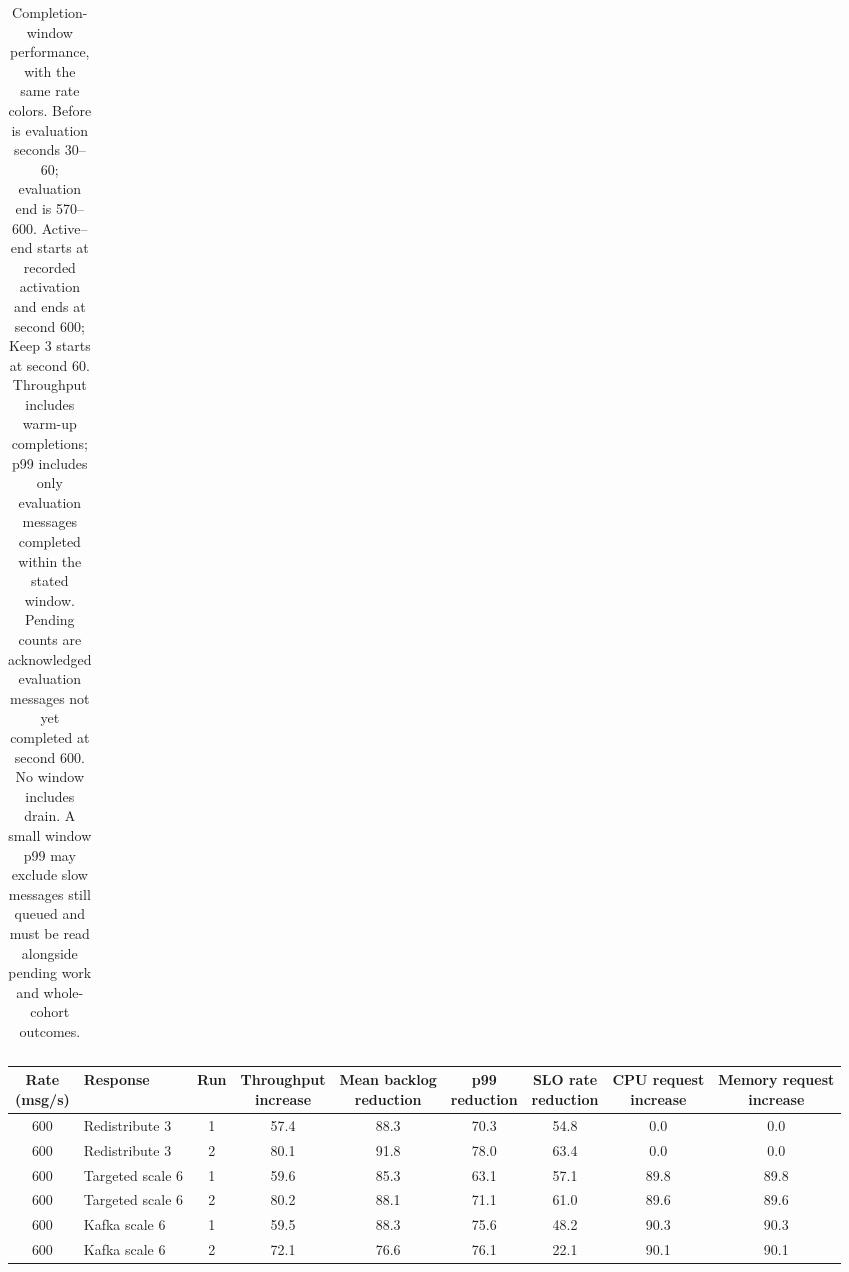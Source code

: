 \begin{table}[!htbp]
\begin{tabular}{@{}clcccccccc@{}}
\bottomrule
\end{tabular}
\caption{Completion-window performance, with the same rate colors. Before is evaluation seconds 30--60; evaluation end is 570--600. Active--end starts at recorded activation and ends at second 600; Keep 3 starts at second 60. Throughput includes warm-up completions; p99 includes only evaluation messages completed within the stated window. Pending counts are acknowledged evaluation messages not yet completed at second 600. No window includes drain. A small window p99 may exclude slow messages still queued and must be read alongside pending work and whole-cohort outcomes.}
\label{tab:four-partition-rate-windows}
\end{table}
\clearpage
\begin{table}[!htbp]
\centering\footnotesize
\setlength{\tabcolsep}{2pt}
\renewcommand{\arraystretch}{1.12}
\begin{tabular}{@{}clccccccc@{}}
\toprule
\rowcolor[HTML]{DDE3EA}
\shortstack{Rate\\(msg/s)} & Response & Run & \shortstack{Throughput\\increase} & \shortstack{Mean backlog\\reduction} & \shortstack{p99\\reduction} & \shortstack{SLO rate\\reduction} & \shortstack{CPU request\\increase} & \shortstack{Memory request\\increase}\\
\midrule
\rowcolor[HTML]{FFE1AD}
600 & Redistribute 3 & 1 & 57.4 & 88.3 & 70.3 & 54.8 & 0.0 & 0.0\\
\rowcolor[HTML]{FFE1AD}
600 & Redistribute 3 & 2 & 80.1 & 91.8 & 78.0 & 63.4 & 0.0 & 0.0\\
\rowcolor[HTML]{FFE1AD}
600 & Targeted scale 6 & 1 & 59.6 & 85.3 & 63.1 & 57.1 & 89.8 & 89.8\\
\rowcolor[HTML]{FFE1AD}
600 & Targeted scale 6 & 2 & 80.2 & 88.1 & 71.1 & 61.0 & 89.6 & 89.6\\
\rowcolor[HTML]{FFE1AD}
600 & Kafka scale 6 & 1 & 59.5 & 88.3 & 75.6 & 48.2 & 90.3 & 90.3\\
\rowcolor[HTML]{FFE1AD}
600 & Kafka scale 6 & 2 & 72.1 & 76.6 & 76.1 & 22.1 & 90.1 & 90.1\\
\bottomrule
\end{tabular}

\end{table}
